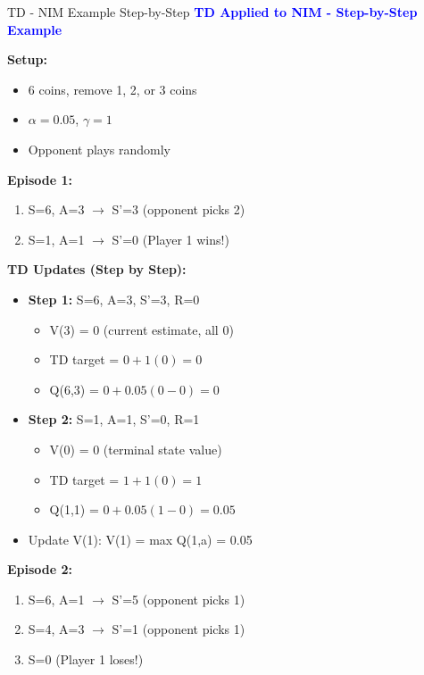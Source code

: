 \documentclass[8pt]{beamer}
\begin{document}
	\begin{frame}{TD - NIM Example Step-by-Step}
		\fontsize{6.5}{7.5}\selectfont
		\textcolor{blue}{\textbf{TD Applied to NIM - Step-by-Step Example}}
		
		\textbf{Setup:}
		\begin{itemize}
			\item 6 coins, remove 1, 2, or 3 coins
			\item $\alpha = 0.05$, $\gamma = 1$
			\item Opponent plays randomly
		\end{itemize}
		
		\textbf{Episode 1:}
		\begin{enumerate}
			\item S=6, A=3 $\rightarrow$ S'=3 (opponent picks 2)
			\item S=1, A=1 $\rightarrow$ S'=0 (Player 1 wins!)
		\end{enumerate}
		
		\textbf{TD Updates (Step by Step):}
		\begin{itemize}
			\item \textbf{Step 1:} S=6, A=3, S'=3, R=0
			\begin{itemize}
				\item V(3) = 0 (current estimate, all 0)
				\item TD target = $0 + 1(0) = 0$
				\item Q(6,3) = $0 + 0.05(0 - 0) = 0$
			\end{itemize}
			\item \textbf{Step 2:} S=1, A=1, S'=0, R=1
			\begin{itemize}
				\item V(0) = 0 (terminal state value)
				\item TD target = $1 + 1(0) = 1$
				\item Q(1,1) = $0 + 0.05(1 - 0) = 0.05$
			\end{itemize}
			\item Update V(1): V(1) = max Q(1,a) = 0.05
		\end{itemize}
		
		\textbf{Episode 2:}
		\begin{enumerate}
			\item S=6, A=1 $\rightarrow$ S'=5 (opponent picks 1)
			\item S=4, A=3 $\rightarrow$ S'=1 (opponent picks 1)
			\item S=0 (Player 1 loses!)
		\end{enumerate}
		

\end{frame}
\end{document}
